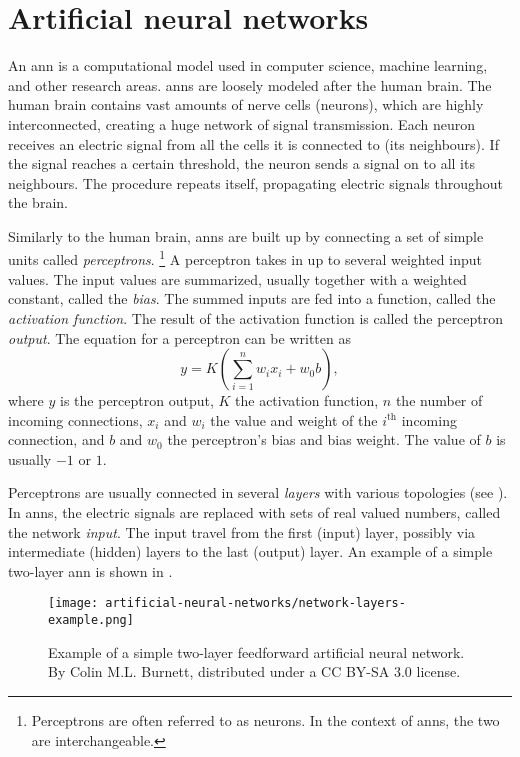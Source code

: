 \section{Artificial neural networks}

An \gls{ann} is a computational model used in computer science, machine learning, and other research areas. \glspl{ann} are loosely modeled after the human brain. The human brain contains vast amounts of nerve cells (neurons), which are highly interconnected, creating a huge network of signal transmission. Each neuron receives an electric signal from all the cells it is connected to (its neighbours). If the signal reaches a certain threshold, the neuron sends a signal on to all its neighbours. The procedure repeats itself, propagating electric signals throughout the brain.

Similarly to the human brain, \glspl{ann} are built up by connecting a set of simple units called \textit{perceptrons}. \footnote{Perceptrons are often referred to as neurons. In the context of \glspl{ann}, the two are interchangeable.} A perceptron takes in up to several weighted input values. The input values are summarized, usually together with a weighted constant, called the \textit{bias}. The summed inputs are fed into a function, called the \textit{activation function}. The result of the activation function is called the perceptron \textit{output}. The equation for a perceptron can be written as
\begin{equation*}
    y = K \left(\sum_{i = 1}^{n} w_{i}x_{i} + w_{0}b \right),
\end{equation*}
where $y$ is the perceptron output, $K$ the activation function, $n$ the number of incoming connections, $x_{i}$ and $w_{i}$ the value and weight of the $i^{\text{th}}$ incoming connection, and $b$ and $w_{0}$ the perceptron's bias and bias weight. The value of $b$ is usually $-1$ or $1$.

Perceptrons are usually connected in several \textit{layers} with various topologies (see ). In \glspl{ann}, the electric signals are replaced with sets of real valued numbers, called the network \textit{input}. The input travel from the first (input) layer, possibly via intermediate (hidden) layers to the last (output) layer. An example of a simple two-layer \gls{ann} is shown in .

\begin{figure}
    \centering
    \texttt{[image: artificial-neural-networks/network-layers-example.png]}
    \caption{Example of a simple two-layer feedforward artificial neural network. By Colin M.L. Burnett, distributed under a CC BY-SA 3.0 license.}
    \label{fig:network-layers-example}
\end{figure}

